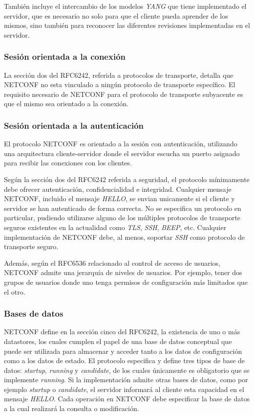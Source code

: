   También incluye el intercambio de los modelos \textit{YANG} que tiene implementado el servidor, que es necesario no solo para que el cliente pueda aprender de los mismos, sino también para reconocer las diferentes revisiones implementadas en el servidor.

  \subsubsection{Sesión orientada a la conexión}
  La sección dos del RFC6242, referida a protocolos de transporte, detalla que NETCONF no esta vinculado a ningún protocolo de transporte específico. El requisito necesario de NETCONF para el protocolo de transporte subyacente es que el mismo sea orientado a la conexión. 

  \subsubsection{Sesión orientada a la autenticación}
  El protocolo NETCONF es orientado a la sesión con autenticación, utilizando una arquitectura cliente-servidor donde el servidor escucha un puerto asignado para recibir las conexiones con los clientes. 

  Según la sección dos del RFC6242 referida a seguridad, el protocolo mínimamente debe ofrecer autenticación, confidencialidad e integridad. Cualquier mensaje NETCONF, incluido el mensaje \textit{HELLO}, se envian unicamente si el cliente y servidor se han autenticado de forma correcta. No se especifica un protocolo en particular, pudiendo utilizarse alguno de los múltiples protocolos de transporte seguros existentes en la actualidad como \textit{TLS}, \textit{SSH}, \textit{BEEP}, etc. Cualquier implementación de NETCONF debe, al menos, soportar \textit{SSH} como protocolo de transporte seguro.

  Además, según el RFC6536 relacionado al control de acceso de usuarios, NETCONF admite una jerarquía de niveles de usuarios. Por ejemplo, tener dos grupos de usuarios donde uno tenga permisos de configuración más limitados que el otro.

  \subsubsection{Bases de datos}
  NETCONF define en la sección cinco del RFC6242, la existencia de uno o más datastores, los cuales cumplen el papel de una base de datos conceptual que puede ser utilizada para almacenar y acceder tanto a los datos de configuración como a los datos de estado. El protocolo especifica y define tres tipos de base de datos: \textit{startup}, \textit{running} y \textit{candidate}, de los cuales únicamente es obligatorio que se implemente \textit{running}. Si la implementación admite otras bases de datos, como por ejemplo \textit{startup} o \textit{candidate}, el servidor informará al cliente esta capacidad en el mensaje \textit{HELLO}. Cada operación en NETCONF debe especificar la base de datos a la cual realizará la consulta o modificación.
  \\

